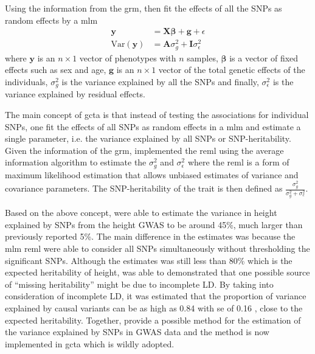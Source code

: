 	Using the information from the \gls{grm}, \citet{Yang2011} then fit the effects of all the \glspl{SNP} as random effects by a \gls{mlm}
	\begin{align}
	\boldsymbol{y} &= \boldsymbol{X\beta}+\boldsymbol{g}+\epsilon\\
	\mathrm{Var}(\boldsymbol{y}) &= \boldsymbol{A}\sigma_g^2+\boldsymbol{I}\sigma_\epsilon^2
	\end{align}
	where $\boldsymbol{y}$ is an $n\times 1$ vector of phenotypes with $n$ samples, $\boldsymbol{\beta}$ is a vector of fixed effects such as sex and age, $\boldsymbol{g}$ is an $n\times 1$ vector of the total genetic effects of the individuals, $\sigma_g^2$ is the variance explained by all the \glspl{SNP} and finally, $\sigma_\epsilon^2$ is the variance explained by residual effects.

	The main concept of \gls{gcta} is that instead of testing the associations for individual \glspl{SNP}, one fit the effects of all \glspl{SNP} as random effects in a \gls{mlm} and estimate a single parameter, i.e. the variance explained by all \glspl{SNP} or \gls{SNP}-heritability.
	Given the information of the \gls{grm}, \citet{Yang2011} implemented the \gls{reml} using the average information algorithm to estimate the $\sigma_g^2$ and $\sigma_\epsilon^2$ where the \gls{reml} is a form of maximum likelihood estimation that allows unbiased estimates of variance and covariance parameters.
	The \gls{SNP}-heritability of the trait is then defined as $\frac{\sigma_g^2}{\sigma_g^2+\sigma_e^2}$.

	Based on the above concept, \citet{Yang2010a} were able to estimate the variance in height explained by \glspl{SNP} from the height \gls{GWAS} to be around 45\%, much larger than previously reported 5\%.
	The main difference in the estimates was because the \gls{mlm} \gls{reml} were able to consider all \glspl{SNP} simultaneously without thresholding the significant \glspl{SNP}.
	Although the estimates was still less than 80\% which is the expected heritability of height, \citet{Yang2010a} was able to demonstrated that one possible source of ``missing heritability'' might be due to incomplete \gls{LD}.
	By taking into consideration of incomplete \gls{LD}, it was estimated that the proportion of variance explained by causal variants can be as high as 0.84 with \gls{se} of 0.16 \citep{Yang2010a}, close to the expected heritability.
	Together, \citet{Yang2011} provide a possible method for the estimation of the variance explained by \glspl{SNP} in \gls{GWAS} data and the method is now implemented in \gls{gcta} which is wildly adopted.
	
